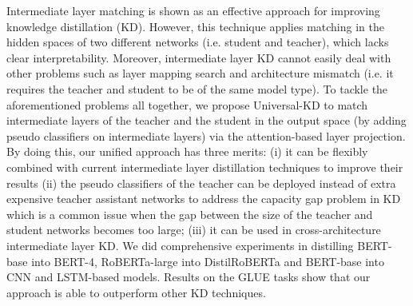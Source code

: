 Intermediate layer matching is shown as an effective approach for improving knowledge distillation (KD). However, this technique applies matching in the hidden spaces of two different networks (i.e. student and teacher), which lacks clear interpretability. Moreover, intermediate layer KD cannot easily deal with other problems such as layer mapping search and architecture mismatch (i.e. it requires the teacher and student to be of the same model type). To tackle the aforementioned problems all together, we propose Universal-KD to match intermediate layers of the teacher and the student in the output space (by adding pseudo classifiers on intermediate layers) via the attention-based layer projection. By doing this, our unified approach has three merits: (i) it can be flexibly combined with current intermediate layer distillation techniques to improve their results (ii) the pseudo classifiers of the teacher can be deployed instead of extra expensive teacher assistant networks to address the capacity gap problem in KD which is a common issue when the gap between the size of the teacher and student networks becomes too large; (iii) it can be used in cross-architecture intermediate layer KD. We did comprehensive experiments in distilling BERT-base into BERT-4, RoBERTa-large into DistilRoBERTa and BERT-base into CNN and LSTM-based models. Results on the GLUE tasks show that our approach is able to outperform other KD techniques.
